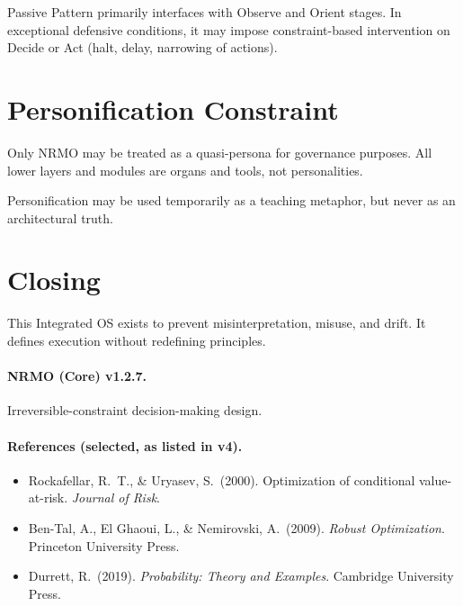 Passive Pattern primarily interfaces with Observe and Orient stages.
In exceptional defensive conditions, it may impose constraint-based
intervention on Decide or Act (halt, delay, narrowing of actions).


\section{Personification Constraint}
\label{sec:opspec-personification-constraint}

Only NRMO may be treated as a quasi-persona for governance purposes.
All lower layers and modules are organs and tools, not personalities.

Personification may be used temporarily as a teaching metaphor, but
never as an architectural truth.

\section{Closing}
\label{sec:opspec-closing}

This Integrated OS exists to prevent misinterpretation, misuse, and
drift. It defines execution without redefining principles.

\paragraph{NRMO (Core) v1.2.7.}
Irreversible-constraint decision-making design.

\paragraph{References (selected, as listed in v4).}
\begin{itemize}
\item Rockafellar, R.~T., \& Uryasev, S.\ (2000). Optimization of
conditional value-at-risk. \textit{Journal of Risk}.
\item Ben-Tal, A., El Ghaoui, L., \& Nemirovski, A.\ (2009).
\textit{Robust Optimization}. Princeton University Press.
\item Durrett, R.\ (2019). \textit{Probability: Theory and Examples}.
Cambridge University Press.
\end{itemize}
